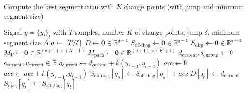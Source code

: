 \documentclass[12pt]{article}
\newcommand\RR{\mathbb{R}}
\DeclarePairedDelimiter\ceil{\lceil}{\rceil}
\begin{document}
\begin{algorithm}
    \scriptsize
    \caption{Compute the best segmentation with $K$ change points (with jump and minimum segment size)} %
    \label{alg:dynp_jump_min_size} %
    \begin{algorithmic} %
        \REQUIRE Signal $y = \{y_t\}_t$ with $T$ samples, number $K$ of change points, jump $\delta$, minimum segment size $\Delta$
        \STATE {}
        \STATE $q\gets \ceil{T/\delta}$ 
        \STATE $D \gets \bm{0}\in\mathbb{R}^{q+1}$ 
        \STATE $S_{\text{off-diag}} \gets \bm{0}\in\mathbb{R}^{q+1}$ 
        \STATE $S_{\text{diag}} \gets \bm{0}\in\mathbb{R}^{q+1}$ 
        \STATE $M_V \gets \bm{0}\in\mathbb{R}^{(q+1)\times (K+1)}$ 
        \STATE $M_{\text{path}} \gets \bm{0}\in\mathbb{R}^{(q+1)\times (K+1)}$ 
        \STATE $d_{\text{current}},s_{\text{current}}\gets0$ 
        \STATE $c_{\text{current}}, v_{\text{current}}\in\RR$ 
        \STATE
        \STATE $d_{\text{current}}\gets d_{\text{current}} + k(y_{t-1}, y_{t-1})$
        \STATE {}
        \STATE $acc\gets0$
        \STATE $acc \gets acc + k(y_{s-1}, y_{t-1})$
        \ENDFOR
        \STATE $S_{\text{off-diag}}[q_s] \gets S_{\text{off-diag}}[q_s] + acc$ 
        \ENDFOR
        \ENDFOR
        \STATE $D[q_t] \gets d_{\text{current}}$ 
        \STATE $S_{\text{diag}}[q_t] \gets S_{\text{off-diag}}[q_t]$


\end{algorithmic}
\end{algorithm}
\end{document}
